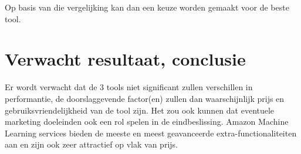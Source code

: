 Op basis van die vergelijking kan dan een keuze worden gemaakt voor de beste tool.

\section{Verwacht resultaat, conclusie}%
\label{sec:verwachte_resultaten}

Er wordt verwacht dat de 3 tools niet significant zullen verschillen in performantie, de doorslaggevende factor(en) zullen dan waarschijnlijk prijs en gebruiksvriendelijkheid van de tool zijn. Het zou ook kunnen dat eventuele marketing doeleinden ook een rol spelen in de eindbeslissing. Amazon Machine Learning services bieden de meeste en meest geavanceerde extra-functionaliteiten aan en zijn ook zeer attractief op vlak van prijs. 